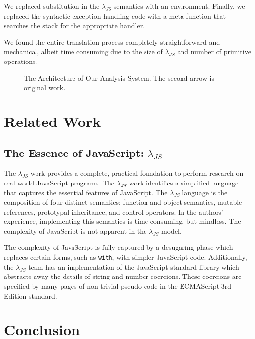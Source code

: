 \documentclass[10pt,letter,english]{article}
\newcommand{\maam}[0]{\textsc{maam}}
\newcommand{\js}[0]{JavaScript}
\newcommand{\lambdajs}[0]{$\lambda_{JS}$}
\begin{document}
We replaced substitution in the \lambdajs{} semantics with an
environment. Finally, we replaced the syntactic exception handling code with a
meta-function that searches the stack for the appropriate handler.

We found the entire translation process completely straightforward and
mechanical, albeit time consuming due to the size of \lambdajs{} and number of
primitive operations.

\begin{figure}
\centering

\caption{The Architecture of Our Analysis System. The second arrow is original work.}
\end{figure}

\section{Related Work}
\subsection{The Essence of JavaScript: \lambdajs{}}

The \lambdajs{} work provides a complete, practical foundation to perform
research on real-world JavaScript programs. The \lambdajs{} work identifies a
simplified language that captures the essential features of \js{}. The
\lambdajs{} language is the composition of four distinct semantics: function and
object semantics, mutable references, prototypal inheritance, and control
operators. In the authors' experience, implementing this semantics is time
consuming, but mindless. The complexity of \js{} is not apparent in the
\lambdajs{} model.

The complexity of \js{} is fully captured by a desugaring phase which replaces
certain forms, such as \texttt{with}, with simpler \js{} code. Additionally, the
\lambdajs{} team has an implementation of the \js{} standard library which
abstracts away the details of string and number coercions. These coercions are
specified by many pages of non-trivial pseudo-code in the ECMAScript 3rd Edition
standard.

\section{Conclusion}



{}

\end{document}
